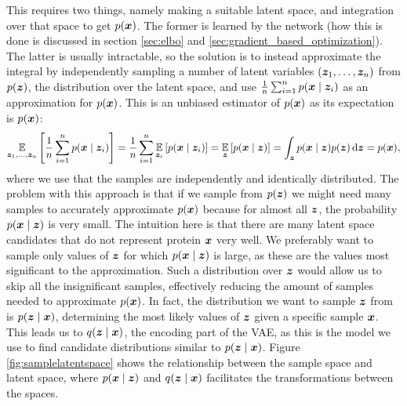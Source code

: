 This requires two things, namely making a suitable latent space, and integration over that space to get $p(\bm{ x })$. The former is learned by the network (how this is done is discussed in section \ref{sec:elbo} and \ref{sec:gradient_based_optimization}). The latter is usually intractable, so the solution is to instead approximate the integral by independently sampling a number of latent variables $(\bm{ z }_1, \ldots, \bm{ z }_n)$ from $p(\bm{ z })$, the distribution over the latent space, and use $\frac{1}{n}\sum_{i = 1}^n p(\bm{ x } \mid \bm{ z }_i)$ as an approximation for $p(\bm{ x })$. This is an unbiased estimator of $p(\bm{ x })$  as its expectation is $p(\bm{ x })$:
\[ \operatorname*{\mathbb{E}}_{\bm{ z }_1, \ldots, \bm{ z }_n}{\mathopen{} \left[ \frac{1}{n}\sum_{i=1}^n p(\bm{ x } \mid \bm{ z }_i) \right] \mathclose{}} = \frac{1}{n}\sum_{i=1}^n \operatorname*{\mathbb{E}}_{\bm{ z }_i}{\mathopen{} \left[ p(\bm{ x } \mid \bm{ z }_i) \right] \mathclose{}} = \operatorname*{\mathbb{E}}_{\bm{ z }}{\mathopen{} \left[ p(\bm{ x } \mid \bm{ z }) \right] \mathclose{}} = \int_{\bm{ z }} p(\bm{ x } \mid \bm{ z })p(\bm{ z }) \mathop{}\!\mathrm{d} \bm{ z } = p(\bm{ x }), \]
where we use that the samples are independently and identically distributed. The problem with this approach is that if we sample from $p(\bm{ z })$ we might need many samples to accurately approximate $p(\bm{ x })$ because for almost all $\bm{ z }$, the probability $p(\bm{ x } \mid \bm{ z })$ is very small. The intuition here is that there are many latent space candidates that do not represent protein $\bm{ x }$ very well. We preferably want to sample only values of $\bm{ z }$ for which $p(\bm{ x } \mid \bm{ z })$ is large, as these are the values most significant to the approximation. Such a distribution over $\bm{ z }$ would allow us to skip all the insignificant samples, effectively reducing the amount of samples needed to approximate $p(\bm{ x })$. In fact, the distribution we want to sample $\bm{ z }$ from is $p(\bm{ z } \mid \bm{ x })$, determining the most likely values of $\bm{ z }$ given a specific sample $\bm{ x }$. This leads us to $q(\bm{ z } \mid \bm{ x })$, the encoding part of the VAE, as this is the model we use to find candidate distributions similar to $p(\bm{ z } \mid \bm{ x })$. Figure \ref{fig:samplelatentspace} shows the relationship between the sample space and latent space, where $p(\bm{ x } \mid \bm{ z })$ and $q{\mathopen{} \left( \bm{ z } \mid \bm{ x } \right) \mathclose{}}$ facilitates the transformations between the spaces.

